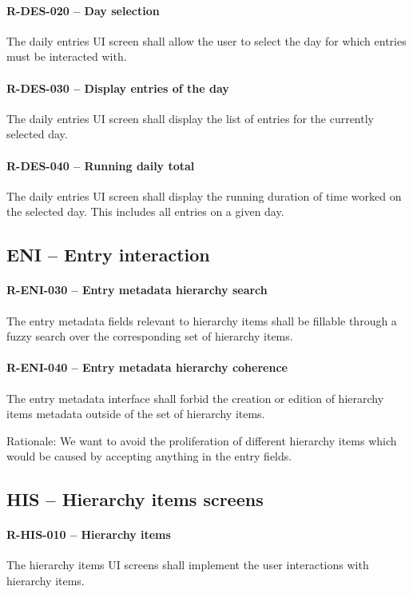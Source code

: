 \paragraph{R-DES-020 -- Day selection}
The daily entries \gls{UI} screen shall allow the user to select the day for
which entries must be interacted with.

\paragraph{R-DES-030 -- Display entries of the day}
The daily entries \gls{UI} screen shall display the list of entries for the
currently selected day.

\paragraph{R-DES-040 -- Running daily total}
The daily entries \gls{UI} screen shall display the running duration of time
worked on the selected day. This includes all entries on a given day.

\subsection{ENI -- Entry interaction}
\paragraph{R-ENI-030 -- Entry metadata hierarchy search}
The entry metadata fields relevant to hierarchy items shall be fillable
through a fuzzy search over the corresponding set of hierarchy items.

\paragraph{R-ENI-040 -- Entry metadata hierarchy coherence}
The entry metadata interface shall forbid the creation or edition of
hierarchy items metadata outside of the set of hierarchy items.

Rationale: We want to avoid the proliferation of different hierarchy items which
would be caused by accepting anything in the entry fields.

\subsection{HIS -- Hierarchy items screens}
\paragraph{R-HIS-010 -- Hierarchy items}
The hierarchy items \gls{UI} screens shall implement the user interactions with
hierarchy items.

